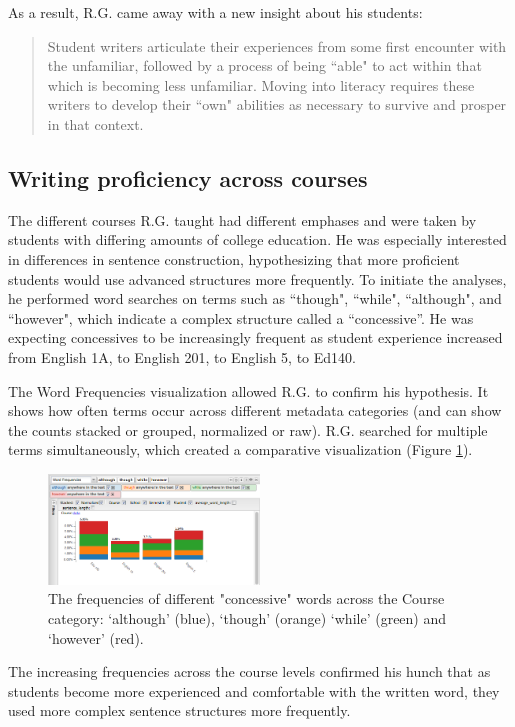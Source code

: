 \documentclass{sig-alternate}
\begin{document}
\begin{enumerate}
As a result, R.G. came away with a new insight about his students:
\begin{quote}
Student writers articulate their experiences from some first encounter with the unfamiliar, followed by a process of being ``able" to act within that which is becoming less unfamiliar.  Moving into literacy requires these writers to develop their ``own" abilities as necessary to survive and prosper in that context.
\end{quote} 

\subsection{Writing proficiency across courses}
The different courses R.G. taught had different emphases and were taken by students with differing amounts of college education. He was especially interested in differences in sentence construction, hypothesizing that more proficient students would use advanced structures more frequently. To initiate the analyses, he performed word searches on terms such as ``though", ``while", ``although", and ``however", which indicate a complex structure called a ``concessive''. He was expecting concessives to be increasingly frequent as student experience increased from English 1A, to English 201, to English 5, to Ed140.

The Word Frequencies visualization allowed R.G. to confirm his hypothesis. It shows how often terms occur across different metadata categories (and can show the counts stacked or grouped, normalized or raw). R.G. searched for multiple terms simultaneously, which created a comparative visualization (Figure \ref{fig:rex05}).
\begin{figure}[h!]
\includegraphics[width=0.5\textwidth]{fig/rex/05.png}
\caption{The frequencies of different "concessive" words across the Course category: `although' (blue), `though' (orange) `while' (green) and `however' (red). \label{fig:rex05}}
\end{figure}
The increasing frequencies across the course levels confirmed his hunch that as students become more experienced and comfortable with the written word, they used more complex sentence structures more frequently. 


\end{enumerate}
\end{document}
